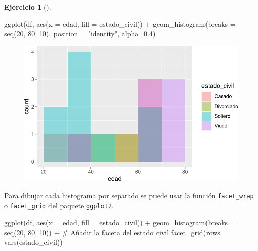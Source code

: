 \documentclass[
  a4paper,
]{scrreport}
\newenvironment{Shaded}{\begin{snugshade}}{\end{snugshade}}
\newcommand{\AttributeTok}[1]{\textcolor[rgb]{0.40,0.45,0.13}{#1}}
\newcommand{\CommentTok}[1]{\textcolor[rgb]{0.37,0.37,0.37}{#1}}
\newcommand{\DecValTok}[1]{\textcolor[rgb]{0.68,0.00,0.00}{#1}}
\newcommand{\FloatTok}[1]{\textcolor[rgb]{0.68,0.00,0.00}{#1}}
\newcommand{\FunctionTok}[1]{\textcolor[rgb]{0.28,0.35,0.67}{#1}}
\newcommand{\NormalTok}[1]{\textcolor[rgb]{0.00,0.23,0.31}{#1}}
\newcommand{\SpecialCharTok}[1]{\textcolor[rgb]{0.37,0.37,0.37}{#1}}
\newcommand{\StringTok}[1]{\textcolor[rgb]{0.13,0.47,0.30}{#1}}
\theoremstyle{definition}
\newtheorem{exercise}{Ejercicio}[chapter]
\theoremstyle{remark}
\begin{document}
\begin{exercise}[]
\begin{tcolorbox}
\begin{Shaded}
\begin{Highlighting}[]
\FunctionTok{ggplot}\NormalTok{(df, }\FunctionTok{aes}\NormalTok{(}\AttributeTok{x =}\NormalTok{ edad, }\AttributeTok{fill =}\NormalTok{ estado\_civil)) }\SpecialCharTok{+}
    \FunctionTok{geom\_histogram}\NormalTok{(}\AttributeTok{breaks =} \FunctionTok{seq}\NormalTok{(}\DecValTok{20}\NormalTok{, }\DecValTok{80}\NormalTok{, }\DecValTok{10}\NormalTok{), }\AttributeTok{position =} \StringTok{"identity"}\NormalTok{, }\AttributeTok{alpha=}\FloatTok{0.4}\NormalTok{)}
\end{Highlighting}
\end{Shaded}

\begin{figure}[H]

{\centering \includegraphics{./03-frecuencias-graficos_files/figure-pdf/unnamed-chunk-32-1.pdf}

}

\end{figure}

Para dibujar cada histograma por separado se puede usar la función
\href{https://aprendeconalf.es/manual-r/07-graficos.html\#facetas}{\texttt{facet\_wrap}}
o \texttt{facet\_grid} del paquete \texttt{ggplot2}.

\begin{Shaded}
\begin{Highlighting}[]
\FunctionTok{ggplot}\NormalTok{(df, }\FunctionTok{aes}\NormalTok{(}\AttributeTok{x =}\NormalTok{ edad, }\AttributeTok{fill =}\NormalTok{ estado\_civil)) }\SpecialCharTok{+}
    \FunctionTok{geom\_histogram}\NormalTok{(}\AttributeTok{breaks =} \FunctionTok{seq}\NormalTok{(}\DecValTok{20}\NormalTok{, }\DecValTok{80}\NormalTok{, }\DecValTok{10}\NormalTok{)) }\SpecialCharTok{+}
    \CommentTok{\# Añadir la faceta del estado civil}
    \FunctionTok{facet\_grid}\NormalTok{(}\AttributeTok{rows =} \FunctionTok{vars}\NormalTok{(estado\_civil))}
\end{Highlighting}
\end{Shaded}


\end{tcolorbox}
\end{exercise}
\end{document}
